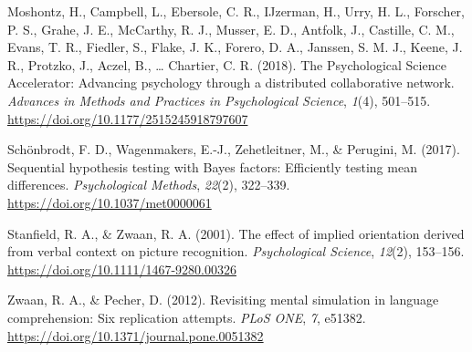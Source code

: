 \documentclass[
  man,floatsintext]{apa6}
\newlength{\cslhangindent}
\newlength{\cslentryspacingunit} %
\newenvironment{CSLReferences}[2] %
 {%
  \setlength{\parindent}{0pt}
  \ifodd #1
  \let\oldpar\par
  \def\par{\hangindent=\cslhangindent\oldpar}
  \fi
  \setlength{\parskip}{#2\cslentryspacingunit}
 }%
 {}
\begin{document}
\begin{CSLReferences}{1}{0}
\leavevmode{}%
Moshontz, H., Campbell, L., Ebersole, C. R., IJzerman, H., Urry, H. L., Forscher, P. S., Grahe, J. E., McCarthy, R. J., Musser, E. D., Antfolk, J., Castille, C. M., Evans, T. R., Fiedler, S., Flake, J. K., Forero, D. A., Janssen, S. M. J., Keene, J. R., Protzko, J., Aczel, B., \ldots{} Chartier, C. R. (2018). The {Psychological Science Accelerator}: {Advancing} psychology through a distributed collaborative network. \emph{Advances in Methods and Practices in Psychological Science}, \emph{1}(4), 501--515. \url{https://doi.org/10.1177/2515245918797607}

\leavevmode{}%
Schönbrodt, F. D., Wagenmakers, E.-J., Zehetleitner, M., \& Perugini, M. (2017). Sequential hypothesis testing with {Bayes} factors: {Efficiently} testing mean differences. \emph{Psychological Methods}, \emph{22}(2), 322--339. \url{https://doi.org/10.1037/met0000061}

\leavevmode{}%
Stanfield, R. A., \& Zwaan, R. A. (2001). The effect of implied orientation derived from verbal context on picture recognition. \emph{Psychological Science}, \emph{12}(2), 153--156. \url{https://doi.org/10.1111/1467-9280.00326}

\leavevmode{}%
Zwaan, R. A., \& Pecher, D. (2012). Revisiting mental simulation in language comprehension: Six replication attempts. \emph{PLoS ONE}, \emph{7}, e51382. \url{https://doi.org/10.1371/journal.pone.0051382}

\end{CSLReferences}

\endgroup
\end{document}
